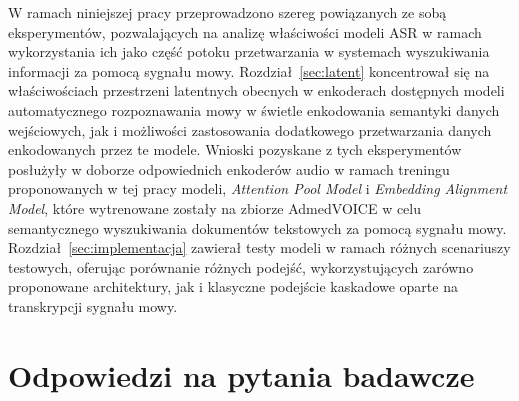 W ramach niniejszej pracy przeprowadzono szereg powiązanych ze sobą eksperymentów, pozwalających na analizę właściwości modeli ASR w ramach wykorzystania ich jako część potoku przetwarzania w systemach wyszukiwania informacji za pomocą sygnału mowy. Rozdział~\ref{sec:latent} koncentrował się na właściwościach przestrzeni latentnych obecnych w enkoderach dostępnych modeli automatycznego rozpoznawania mowy w świetle enkodowania semantyki danych wejściowych, jak i możliwości zastosowania dodatkowego przetwarzania danych enkodowanych przez te modele. Wnioski pozyskane z tych eksperymentów posłużyły w doborze odpowiednich enkoderów audio w ramach treningu proponowanych w tej pracy modeli, \textit{Attention Pool Model} i \textit{Embedding Alignment Model}, które wytrenowane zostały na zbiorze AdmedVOICE w celu semantycznego wyszukiwania dokumentów tekstowych za pomocą sygnału mowy. Rozdział~\ref{sec:implementacja} zawierał testy modeli w ramach różnych scenariuszy testowych, oferując porównanie różnych podejść, wykorzystujących zarówno proponowane architektury, jak i klasyczne podejście kaskadowe oparte na transkrypcji sygnału mowy.

\section{Odpowiedzi na pytania badawcze}
